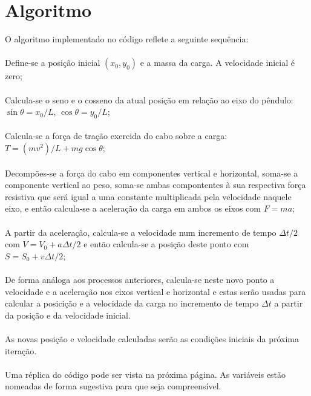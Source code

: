 \documentclass[12pt]{article}
\begin{document}
    \section*{Algoritmo}
    \noindent O algoritmo implementado no código reflete a seguinte sequência:\\\\
    Define-se a posição inicial $(x_0, y_0)$ e a massa da carga. A velocidade inicial é zero;\\\\
    Calcula-se o seno e o cosseno da atual posição em relação ao eixo do pêndulo: $\sin\theta = x_0/L$, $\cos\theta=y_0/L$;\\\\
    Calcula-se a força de tração exercida do cabo sobre a carga: $T=(mv^2)/L + mg\cos\theta$; \\\\
    Decompões-se a força do cabo em componentes vertical e horizontal, soma-se a componente vertical ao peso, soma-se ambas
    compontentes à sua respectiva força resistiva que será igual a uma constante multiplicada pela velocidade naquele eixo,
    e então calcula-se a aceleração da carga em ambos os eixos com $F=ma$;\\\\
    A partir da aceleração, calcula-se a velocidade num incremento de tempo $\Delta t/2$ com $V = V_0 + a\Delta t/2$
    e então calcula-se a posição deste ponto com $S = S_0 + v\Delta t/2$;\\\\
    De forma análoga aos processos anteriores, calcula-se neste novo ponto a velocidade e a aceleração nos eixos vertical e horizontal
    e estas serão usadas para calcular a posicição e a velocidade da carga no incremento de tempo $\Delta t$ a partir da posição e 
    da velocidade inicial.\\\\
    As novas posição e velocidade calculadas serão as condições iniciais da próxima iteração.\\\\
    Uma réplica do código pode ser vista na próxima página. As variáveis estão nomeadas de forma sugestiva para que seja
    compreensível.
    \newpage
\end{document}
